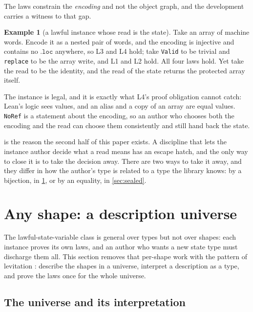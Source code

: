 \documentclass[11pt,a4paper]{article}
\theoremstyle{definition}
\newtheorem{example}[definition]{Example}
\theoremstyle{plain}
\newcommand{\code}[1]{\texttt{#1}}
\newcommand{\Code}[1]{\texttt{#1}}
\begin{document}
The laws constrain the \emph{encoding} and not the object graph, and the
development carries a witness to that gap.

\begin{example}[a lawful instance whose read is the state]\label{ex:leak}
Take an array of machine words. Encode it as a nested pair of words, and the
encoding is injective and contains no $\code{.loc}$ anywhere, so L3 and L4 hold;
take \code{Valid} to be trivial and \code{replace} to be the array write, and L1
and L2 hold. All four laws hold. Yet take the read to be the identity, and the
read of the state returns the protected array itself.

The instance is legal, and it is exactly what L4's proof obligation cannot catch:
Lean's logic sees values, and an alias and a copy of an array are equal values.
\Code{NoRef} is a statement about the encoding, so an author who chooses both the
encoding and the read can choose them consistently and still hand back the state.
\end{example}

 is the reason the second half of this paper exists. A discipline
that lets the instance author decide what a read means has an escape hatch, and
the only way to close it is to take the decision away. There are two ways to take
it away, and they differ in how the author's type is related to a type the
library knows: by a bijection, in \cref{sec:levitation}, or by an equality, in
\cref{sec:sealed}.

\section{Any shape: a description universe}\label{sec:levitation}

The lawful-state-variable class is general over types but not over shapes: each
instance proves its own laws, and an author who wants a new state type must
discharge them all. This section removes that per-shape work with the pattern of
levitation \cite{chapman2010levitation}: describe the shapes in a universe,
interpret a description as a type, and prove the laws once for the whole
universe.

\subsection{The universe and its interpretation}
\end{document}
